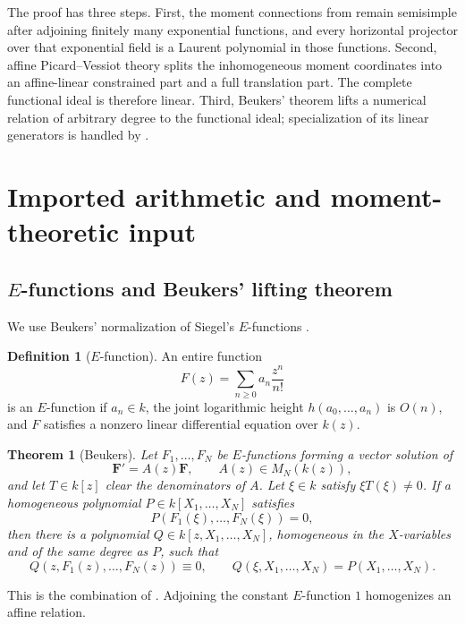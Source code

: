 \documentclass[11pt]{article}
\numberwithin{equation}{section}
\newtheorem{theorem}{Theorem}[section]
\theoremstyle{definition}
\newtheorem{definition}[definition]{Definition}
\theoremstyle{remark}
\begin{document}
The proof has three steps.  First, the moment connections from
\cite{LongEIT} remain semisimple after adjoining finitely many exponential
functions, and every horizontal projector over that exponential field is a
Laurent polynomial in those functions.  Second, affine Picard--Vessiot theory
splits the inhomogeneous moment coordinates into an affine-linear constrained
part and a full translation part.  The complete functional ideal is therefore
linear.  Third, Beukers' theorem lifts a numerical relation of arbitrary
degree to the functional ideal; specialization of its linear generators is
handled by \cite{LongLinearKZ}.

\section{Imported arithmetic and moment-theoretic input}
\label{sec:input}

\subsection{\texorpdfstring{$E$}{E}-functions and Beukers' lifting theorem}

We use Beukers' normalization of Siegel's $E$-functions
\cite[Section~1]{Beukers}.

\begin{definition}[$E$-function]
An entire function
\[
  F(z)=\sum_{n\ge0}a_n\frac{z^n}{n!}
\]
is an $E$-function if $a_n\in k$, the joint logarithmic height
$h(a_0,\ldots,a_n)$ is $O(n)$, and $F$ satisfies a nonzero linear
differential equation over $k(z)$.
\end{definition}

\begin{theorem}[Beukers]\label{thm:Beukers}
Let $F_1,\ldots,F_N$ be $E$-functions forming a vector solution of
\[
  \mathbf F'=A(z)\mathbf F,
  \qquad A(z)\in M_N(k(z)),
\]
and let $T\in k[z]$ clear the denominators of $A$.  Let
$\xi\in k$ satisfy $\xi T(\xi)\ne0$.  If a homogeneous polynomial
$P\in k[X_1,\ldots,X_N]$ satisfies
\[
  P(F_1(\xi),\ldots,F_N(\xi))=0,
\]
then there is a polynomial
$Q\in k[z,X_1,\ldots,X_N]$, homogeneous in the $X$-variables and of the
same degree as $P$, such that
\[
  Q(z,F_1(z),\ldots,F_N(z))\equiv0,
  \qquad
  Q(\xi,X_1,\ldots,X_N)=P(X_1,\ldots,X_N).
\]
\end{theorem}

This is the combination of \cite[Theorems~1.3 and~3.2]{Beukers}.  Adjoining
the constant $E$-function $1$ homogenizes an affine relation.
\end{document}

